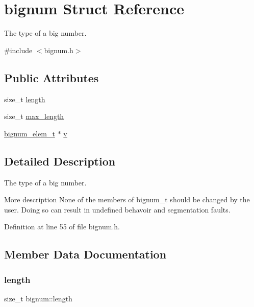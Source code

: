 \hypertarget{structbignum}{}\section{bignum Struct Reference}
\label{structbignum}


The type of a big number.  




{\ttfamily \#include $<$bignum.\+h$>$}

\subsection*{Public Attributes}
\begin{DoxyCompactItemize}
\item 
size\+\_\+t \hyperlink{structbignum_a5cec444ac0a9e7b44a073dbb0f0bf915}{length}
\item 
size\+\_\+t \hyperlink{structbignum_aca95f5f27d2bb952cb8a6f906a138e62}{max\+\_\+length}
\item 
\hyperlink{bignum_8h_a8a2940600ccf96356e2a21b453d3bd92}{bignum\+\_\+elem\+\_\+t} $\ast$ \hyperlink{structbignum_a60955e5f7046ec12c4c292510ad18146}{v}
\end{DoxyCompactItemize}


\subsection{Detailed Description}
The type of a big number. 

More description  None of the members of bignum\+\_\+t should be changed by the user. Doing so can result in undefined behavoir and segmentation faults. 

Definition at line 55 of file bignum.\+h.



\subsection{Member Data Documentation}
\mbox{\label{structbignum_a5cec444ac0a9e7b44a073dbb0f0bf915}} 
\subsubsection{\texorpdfstring{length}{length}}
{\footnotesize\ttfamily size\+\_\+t bignum\+::length}

